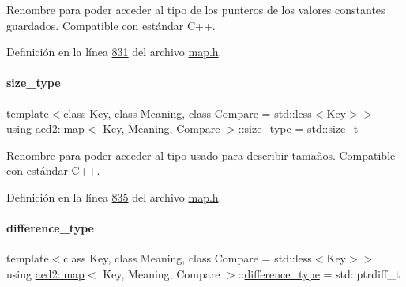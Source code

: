 Renombre para poder acceder al tipo de los punteros de los valores constantes guardados. Compatible con estándar C++. 



Definición en la línea \hyperlink{map_8h_source_l00831}{831} del archivo \hyperlink{map_8h_source}{map.\+h}.

\mbox{\label{classaed2_1_1map_a8cf1c570f605e9c0ad6feb8ce12c9400_a8cf1c570f605e9c0ad6feb8ce12c9400}} 
\paragraph{\texorpdfstring{size\+\_\+type}{size\_type}}
{\footnotesize\ttfamily template$<$class Key, class Meaning, class Compare = std\+::less$<$\+Key$>$$>$ \\
using \hyperlink{classaed2_1_1map}{aed2\+::map}$<$ Key, Meaning, Compare $>$\+::\hyperlink{classaed2_1_1map_a8cf1c570f605e9c0ad6feb8ce12c9400_a8cf1c570f605e9c0ad6feb8ce12c9400}{size\+\_\+type} =  std\+::size\+\_\+t}



Renombre para poder acceder al tipo usado para describir tamaños. Compatible con estándar C++. 



Definición en la línea \hyperlink{map_8h_source_l00835}{835} del archivo \hyperlink{map_8h_source}{map.\+h}.

\mbox{\label{classaed2_1_1map_a2f55b88809000fcbfce1c6cfef1ba74d_a2f55b88809000fcbfce1c6cfef1ba74d}} 
\paragraph{\texorpdfstring{difference\+\_\+type}{difference\_type}}
{\footnotesize\ttfamily template$<$class Key, class Meaning, class Compare = std\+::less$<$\+Key$>$$>$ \\
using \hyperlink{classaed2_1_1map}{aed2\+::map}$<$ Key, Meaning, Compare $>$\+::\hyperlink{classaed2_1_1map_a2f55b88809000fcbfce1c6cfef1ba74d_a2f55b88809000fcbfce1c6cfef1ba74d}{difference\+\_\+type} =  std\+::ptrdiff\+\_\+t}



